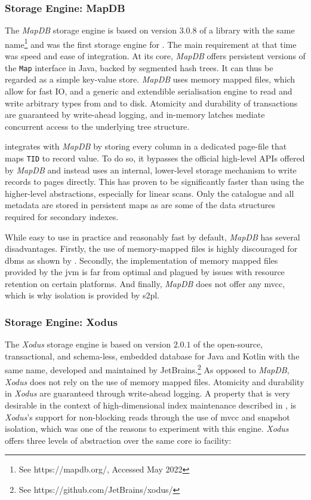 \subsubsection{Storage Engine: MapDB}

The \emph{MapDB} storage engine is based on version $3.0.8$ of a library with the same name\footnote{See https://mapdb.org/, Accessed May 2022} and was the first storage engine for \cottontail{}. The main requirement at that time was speed and ease of integration. At its core, \emph{MapDB} offers persistent versions of the \texttt{Map} interface in Java, backed by segmented hash trees. It can thus be regarded as a simple key-value store. \emph{MapDB} uses memory mapped files, which allow for fast IO, and a generic and extendible serialisation engine to read and write arbitrary types from and to disk. Atomicity and durability of transactions are guaranteed by write-ahead logging, and in-memory latches mediate concurrent access to the underlying tree structure.

\cottontail{} integrates with \emph{MapDB} by storing every column in a dedicated page-file that maps \texttt{TID} to record value. To do so, it bypasses the official high-level APIs offered by \emph{MapDB} and instead uses an internal, lower-level storage mechanism to write records to pages directly. This has proven to be significantly faster than using the higher-level abstractions, especially for linear scans. Only the catalogue and all metadata are stored in persistent maps as are some of the data structures required for secondary indexes.

While easy to use in practice and reasonably fast by default, \emph{MapDB} has several disadvantages. Firstly, the use of memory-mapped files is highly discouraged for \acrshort{dbms} as shown by \cite{Crotty:2022Are}. Secondly, the implementation of memory mapped files provided by the \acrshort{jvm} is far from optimal and plagued by issues with resource retention on certain platforms. And finally, \emph{MapDB} does not offer any \acrshort{mvcc}, which is why isolation is provided by \acrshort{s2pl}.

\subsubsection{Storage Engine: Xodus}
The \emph{Xodus} storage engine is based on version $2.0.1$ of the open-source, transactional, and schema-less, embedded database for Java and Kotlin with the same name, developed and maintained by JetBrains.\footnote{See https://github.com/JetBrains/xodus/} As opposed to \emph{MapDB}, \emph{Xodus} does not rely on the use of memory mapped files. Atomicity and durability in \emph{Xodus} are guaranteed through write-ahead logging. A property that is very desirable in the context of high-dimensional index maintenance described in , is \emph{Xodus}'s support for non-blocking reads through the use of \acrshort{mvcc} and snapshot isolation, which was one of the reasons to experiment with this engine. \emph{Xodus} offers three levels of abstraction over the same core \acrshort{io} facility:

